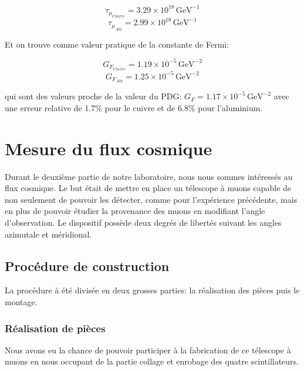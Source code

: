 \documentclass[12pt]{article}
\begin{document}
\[ \tau_{\mu_{Cuivre}}=3.29\times10^{18}\,\text{GeV}^{-1}\]
\[ \tau_{\mu_{Alu}}=2.99\times10^{18}\,\text{GeV}^{-1}\]

Et on trouve comme valeur pratique de la constante de Fermi:

\[ G_{F_{Cuivre}}=1.19\times10^{-5}\,\text{GeV}^{-2}\]
\[ G_{F_{Alu}}=1.25\times10^{-5}\,\text{GeV}^{-2}\]

qui sont des valeurs proche de la valeur du PDG: $G_{F}=1.17\times10^{-5}\,\text{GeV}^{-2}$ avec une erreur relative de  1.7\% pour le cuivre et de 6.8\% pour l'aluminium.


\newpage
\section{Mesure du flux cosmique}
Durant le deuxième partie de notre laboratoire, nous nous sommes intéressés au flux cosmique. Le but était de mettre en place un télescope à muons capable de non seulement de pouvoir les détecter, comme pour l'expérience précédente, mais en plus de pouvoir étudier la provenance des muons en modifiant l'angle d'observation. Le dispositif possède deux degrés de libertés suivant les angles azimutale et méridional.

\subsection{Procédure de construction}
La procédure à été divisée en deux grosses parties: la réalisation des pièces puis le montage. 

\subsubsection{Réalisation de pièces}
Nous avons eu la chance de pouvoir participer à la fabrication de ce télescope à muons en nous occupant de la partie collage et enrobage des quatre scintillateurs. 
\end{document}
